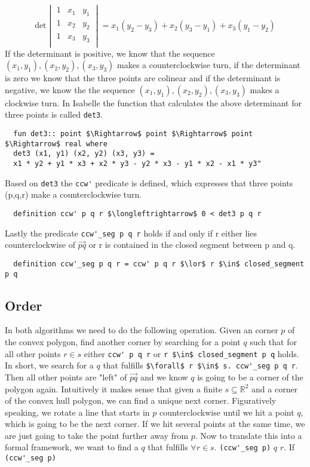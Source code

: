 \[
\text{det} 
\begin{vmatrix}
1 & x_1 & y_1 \\
1 & x_2 & y_2 \\
1 & x_3 & y_3 \\
\end{vmatrix}
= x_1 (y_2 - y_3 ) + x_2 (y_3 - y_1)+ x_3  (y_1 - y_2)
\]
If the determinant is positive, we know that the sequence $(x_1,y_1), (x_2,y_2) , (x_3,y_3)$
makes a counterclockwise turn, if the determinant is zero we know that the three points are colinear 
and if the determinant is negative, we know the the sequence $(x_1,y_1), (x_2,y_2) , (x_3,y_3)$
makes a clockwise turn. %
In Isabelle the function that calculates the above determinant for three 
points is called \lstinline|det3|.
\begin{lstlisting}
  fun det3:: point $\Rightarrow$ point $\Rightarrow$ point $\Rightarrow$ real where 
  det3 (x1, y1) (x2, y2) (x3, y3) =
  x1 * y2 + y1 * x3 + x2 * y3 - y2 * x3 - y1 * x2 - x1 * y3"
\end{lstlisting}
Based on \lstinline|det3| the \lstinline|ccw'| predicate is defined, which expresses that 
three points (p,q,r) make a counterclockwise turn.
\begin{lstlisting}
  definition ccw' p q r $\longleftrightarrow$ 0 < det3 p q r
\end{lstlisting}
Lastly the predicate \lstinline|ccw'_seg p q r| holds if and only if r either lies 
counterclockwise of $\vec{pq}$ or r is contained in the closed segment between p and q.
\begin{lstlisting}
  definition ccw'_seg p q r = ccw' p q r $\lor$ r $\in$ closed_segment p q
\end{lstlisting}


\subsection{Order}
In both algorithms we need to do the following operation. Given an corner $p$ of the convex polygon,
find another corner by searching for a point $q$ such that for all other points 
$r \in s$ either \lstinline|ccw' p q r| or \lstinline|r $\in$ closed_segment p q|
holds. In short, we search for a $q$ that fulfills  
\lstinline|$\forall$ r $\in$ s. ccw'_seg p q r|. 
Then all other points are "left" of $\vec{p q}$ and we know $q$ is going 
to be a corner of the polygon again. Intuitively it makes sense that given a finite 
$s \subseteq \mathbb{R}^2$ and a corner of the convex hull polygon, 
we can find a unique next corner. Figuratively speaking, we rotate a line that 
starts in $p$ counterclockwise until we hit a point $q$, which is going to be the next
corner. If we hit several points at the same time, we are just going to take the point 
further away from $p$. Now to translate this into a formal framework, we want to find
a $q$ that fulfills $\forall r \in s.$ \lstinline|(ccw'_seg p)| $q$ $r$. If 
\lstinline|(ccw'_seg p)|







